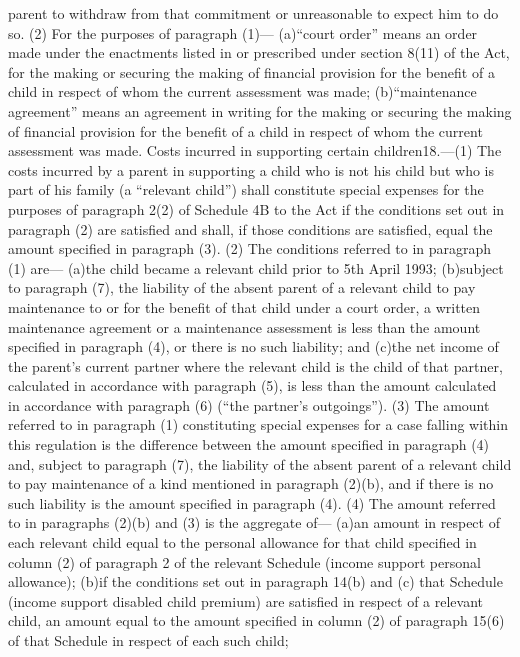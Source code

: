 \documentclass[a4paper]{article}
\begin{document}
parent to withdraw from that commitment or unreasonable to expect him to do so.
(2) For the purposes of paragraph (1)—
(a)“court order” means an order made under the enactments listed in or
prescribed under section 8(11) of the Act, for the making or securing the making
of financial provision for the benefit of a child in respect of whom the current
assessment was made;
(b)“maintenance agreement” means an agreement in writing for the making or
securing the making of financial provision for the benefit of a child in respect
of whom the current assessment was made.
Costs incurred in supporting certain children18.—(1) The costs incurred by a
parent in supporting a child who is not his child but who is part of his family
(a “relevant child”) shall constitute special expenses for the purposes of
paragraph 2(2) of Schedule 4B to the Act if the conditions set out in paragraph
(2) are satisfied and shall, if those conditions are satisfied, equal the amount
specified in paragraph (3).
(2) The conditions referred to in paragraph (1) are—
(a)the child became a relevant child prior to 5th April 1993;
(b)subject to paragraph (7), the liability of the absent parent of a relevant
child to pay maintenance to or for the benefit of that child under a court
order, a written maintenance agreement or a maintenance assessment is less than
the amount specified in paragraph (4), or there is no such liability; and
(c)the net income of the parent’s current partner where the relevant child is
the child of that partner, calculated in accordance with paragraph (5), is less
than the amount calculated in accordance with paragraph (6) (“the partner’s
outgoings”).
(3) The amount referred to in paragraph (1) constituting special expenses for a
case falling within this regulation is the difference between the amount
specified in paragraph (4) and, subject to paragraph (7), the liability of the
absent parent of a relevant child to pay maintenance of a kind mentioned in
paragraph (2)(b), and if there is no such liability is the amount specified in
paragraph (4).
(4) The amount referred to in paragraphs (2)(b) and (3) is the aggregate of—
(a)an amount in respect of each relevant child equal to the personal allowance
for that child specified in column (2) of paragraph 2 of the relevant Schedule
(income support personal allowance);
(b)if the conditions set out in paragraph 14(b) and (c) that Schedule (income
support disabled child premium) are satisfied in respect of a relevant child, an
amount equal to the amount specified in column (2) of paragraph 15(6) of that
Schedule in respect of each such child;
\end{document}
